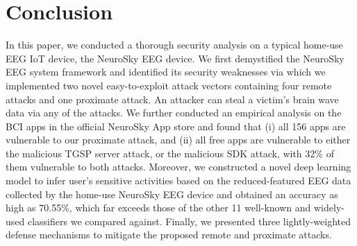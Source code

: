 \section{Conclusion}
\label{sec:conclusion}

In this paper, we conducted a thorough security analysis on a typical home-use EEG IoT device, the NeuroSky EEG device. We first demystified the NeuroSky EEG system framework and identified its security weaknesses via which we implemented two novel easy-to-exploit attack vectors containing four remote attacks and one proximate attack. An attacker can steal a victim's brain wave data via any of the attacks. We further conducted an empirical analysis on the BCI apps in the official NeuroSky App store and found that (i) all 156 apps are vulnerable to our proximate attack, and (ii) all free apps are vulnerable to either the malicious TGSP server attack, or the malicious SDK attack, with 32\% of them vulnerable to both attacks. Moreover, we constructed a novel deep learning model to infer user's sensitive activities based on the reduced-featured EEG data collected by the home-use NeuroSky EEG device and obtained an accuracy as high as 70.55\%, which far exceeds those of the other 11 well-known and widely-used classifiers we compared against. Finally, we presented three lightly-weighted defense mechanisms to mitigate the proposed remote and proximate attacks.